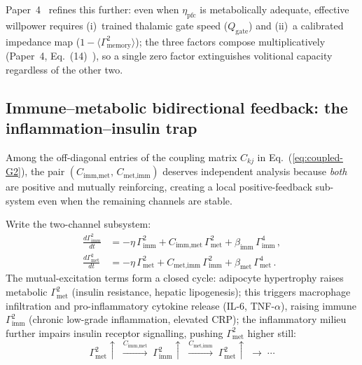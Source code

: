 \documentclass[aps,pre,twocolumn,superscriptaddress,floatfix]{revtex4-2}
\begin{document}
Paper~4~\cite{Paper4} refines this further:
even when $\eta_{\text{pfc}}$ is metabolically
adequate, effective willpower requires (i)~trained
thalamic gate speed ($Q_{\text{gate}}$) and
(ii)~a calibrated impedance map
($1 - \langle\Gamma^2_{\text{memory}}\rangle$);
the three factors compose multiplicatively
(Paper~4, Eq.~(14)~\cite{Paper4}),
so a single zero factor extinguishes volitional
capacity regardless of the other two.


\subsection{Immune--metabolic bidirectional feedback:
  the inflammation--insulin trap}
\label{sec:imm-met-loop}

Among the off-diagonal entries of the coupling matrix
$C_{kj}$ in Eq.~(\ref{eq:coupled-G2}), the pair
$(C_{\text{imm,met}},\,C_{\text{met,imm}})$ deserves
independent analysis because \emph{both} are positive
and mutually reinforcing, creating a local
positive-feedback sub-system even when
the remaining channels are stable.

Write the two-channel subsystem:
\begin{align}
  \frac{d\Gamma_{\text{imm}}^2}{dt}
  &= -\eta\,\Gamma_{\text{imm}}^2
     + C_{\text{imm,met}}\,\Gamma_{\text{met}}^2
     + \beta_{\text{imm}}\,\Gamma_{\text{imm}}^4\,,
  \label{eq:imm-loop} \\
  \frac{d\Gamma_{\text{met}}^2}{dt}
  &= -\eta\,\Gamma_{\text{met}}^2
     + C_{\text{met,imm}}\,\Gamma_{\text{imm}}^2
     + \beta_{\text{met}}\,\Gamma_{\text{met}}^4\,.
  \label{eq:met-loop}
\end{align}
The mutual-excitation terms form a closed cycle:
adipocyte hypertrophy raises metabolic $\Gamma_{\text{met}}^2$
(insulin resistance, hepatic lipogenesis); this triggers
macrophage infiltration and pro-inflammatory cytokine
release (IL-6, TNF-$\alpha$), raising immune
$\Gamma_{\text{imm}}^2$ (chronic low-grade inflammation,
elevated CRP); the inflammatory milieu further impairs
insulin receptor signalling, pushing
$\Gamma_{\text{met}}^2$ higher still:
\[
  \Gamma_{\text{met}}^2\!\uparrow
  \;\xrightarrow{C_{\text{imm,met}}}
  \;\Gamma_{\text{imm}}^2\!\uparrow
  \;\xrightarrow{C_{\text{met,imm}}}
  \;\Gamma_{\text{met}}^2\!\uparrow
  \;\to\;\cdots
\]
\end{document}
